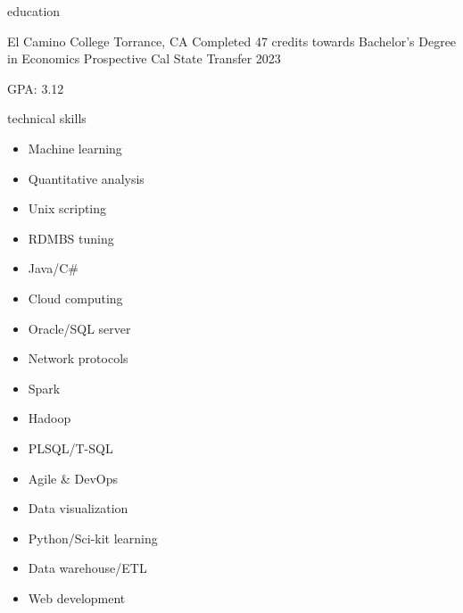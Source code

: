 \documentclass{resume} %
\begin{document}
	\makeheader

	\begin{rSection}{education}
		\begin{rPlace}
			{El Camino College}
			{Torrance, CA}
			{Completed 47 credits towards Bachelor\rq s Degree in Economics}
			{Prospective Cal State Transfer 2023}
			
			GPA: 3.12
		\end{rPlace}
	\end{rSection}

	\begin{rSection}{technical skills}
		\vspace{-5px}
		\begin{multicols}{3}
			\begin{itemize}
				\item Machine learning
				\item Quantitative analysis
				\item Unix scripting
				\item RDMBS tuning
				\item Java/C\#
				\item Cloud computing
				\item Oracle/SQL server
				\item Network protocols
				\item Spark
				\item Hadoop
				\item PLSQL/T-SQL
				\item Agile \& DevOps
				\item Data visualization
				\item Python/Sci-kit learning
				\item Data warehouse/ETL
				\item Web development
			\end{itemize}
		\end{multicols}
	\end{rSection}
\end{document}
